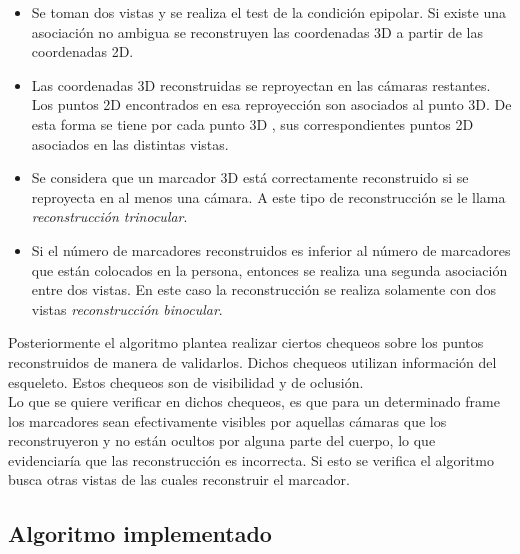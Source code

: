 \begin{itemize}
\item Se toman dos vistas y se realiza el test de la condición epipolar. Si existe una asociación no ambigua se reconstruyen  las coordenadas 3D a partir de las coordenadas 2D.

\item Las coordenadas 3D reconstruidas se reproyectan en las cámaras restantes. Los puntos 2D encontrados en esa reproyección son asociados al punto 3D. De esta forma se tiene por cada punto 3D , sus correspondientes puntos 2D asociados en las distintas vistas.\

\item Se considera que un marcador 3D está correctamente reconstruido si se reproyecta en al menos una cámara. A este tipo de reconstrucción se le llama \textit{reconstrucción trinocular}.\\

\item Si el número de marcadores reconstruidos es inferior al número de marcadores que están colocados en la persona, entonces se realiza una segunda asociación entre dos vistas. En este caso la reconstrucción se realiza solamente con dos vistas \textit{reconstrucción binocular}.\\

\end{itemize}

Posteriormente el algoritmo plantea realizar ciertos chequeos sobre los puntos reconstruidos de manera de validarlos. Dichos chequeos utilizan información del esqueleto. Estos chequeos son de visibilidad y de oclusión.\\

Lo que se quiere verificar en dichos chequeos, es que para un determinado frame los marcadores sean efectivamente visibles por aquellas cámaras que los reconstruyeron y no están ocultos por alguna parte del cuerpo, lo que evidenciaría que las reconstrucción es incorrecta. Si esto se verifica el algoritmo busca otras vistas de las cuales reconstruir el marcador.\\

\subsection{Algoritmo implementado}


